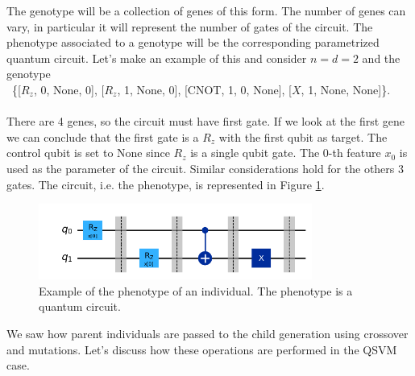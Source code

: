 \documentclass[12pt]{article}
\begin{document}
The genotype will be a collection of genes of this form. The number of genes can vary, in particular it will represent the number of gates of the circuit. The phenotype associated to a genotype will be the corresponding parametrized quantum circuit. Let's make an example of this and consider $n=d=2$ and the genotype \\\ \{[$R_z$, 0, None, 0], [$R_z$, 1, None, 0], [CNOT, 1, 0, None], [$X$, 1, None, None]\}. \\\\ There are 4 genes, so the circuit must have first gate. If we look at the first gene we can conclude that the first gate is a $R_z$ with the first qubit as target. The control qubit is set to None since $R_z$ is a single qubit gate. The 0-th feature $x_0$ is used as the parameter of the circuit. Similar considerations hold for the others 3 gates. The circuit, i.e. the phenotype, is represented in Figure \ref{fig:fenotip}.
\begin{figure}[h!]
    \centering
    \includegraphics[width=0.8\textwidth]{images/fenotip.png}
    \caption{Example of the phenotype of an individual. The phenotype is a quantum circuit.}
    \label{fig:fenotip}
\end{figure}

We saw how parent individuals are passed to the child generation using crossover and mutations. Let's discuss how these operations are performed in the QSVM case. 
\end{document}
